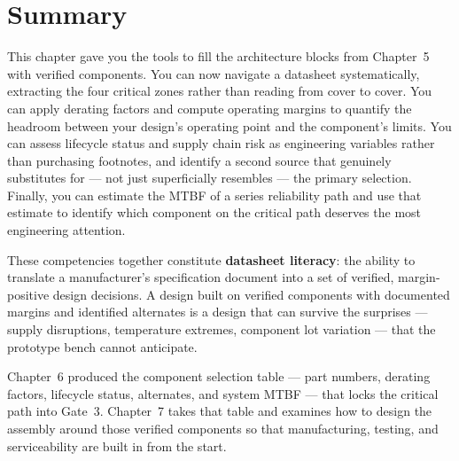 \section{Summary}
\label{sec:ch6-summary}

This chapter gave you the tools to fill the architecture blocks from Chapter~5 with verified components.
You can now navigate a datasheet systematically, extracting the four critical zones rather than reading from cover to cover.
You can apply derating factors and compute operating margins to quantify the headroom between your design's operating point and the component's limits.
You can assess lifecycle status and supply chain risk as engineering variables rather than purchasing footnotes, and identify a second source that genuinely substitutes for --- not just superficially resembles --- the primary selection.
Finally, you can estimate the MTBF of a series reliability path and use that estimate to identify which component on the critical path deserves the most engineering attention.

These competencies together constitute \textbf{datasheet literacy}: the ability to translate a manufacturer's specification document into a set of verified, margin-positive design decisions.
A design built on verified components with documented margins and identified alternates is a design that can survive the surprises --- supply disruptions, temperature extremes, component lot variation --- that the prototype bench cannot anticipate.

Chapter~6 produced the component selection table --- part numbers, derating factors, lifecycle status, alternates, and system MTBF --- that locks the critical path into Gate~3.
Chapter~7 takes that table and examines how to design the assembly around those verified components so that manufacturing, testing, and serviceability are built in from the start.
